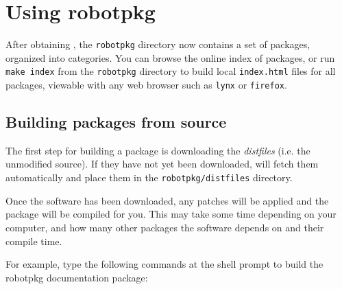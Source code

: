 %
%
%
%
%

\section{Using robotpkg} %

After obtaining \robotpkg, the  {\tt robotpkg} directory now  contains a set of
packages, organized   into  categories.  You can   browse  the online  index of
packages, or run {\tt  make index} from the {\tt  robotpkg} directory to  build
local {\tt index.html}  files for all  packages, viewable with any web  browser
such as {\tt lynx} or {\tt firefox}.


\subsection{Building packages from source} %

The  first step for  building  a  package  is  downloading the {\em  distfiles}
(i.e. the unmodified  source). If they have not  yet been downloaded, \robotpkg
will  fetch them automatically  and place them  in the {\tt robotpkg/distfiles}
directory.

Once the software  has  been downloaded,  any  patches will be applied  and the
package will  be compiled for  you.  This may  take some time depending on your
computer, and how many other packages the software depends on and their compile
time.

For  example,  type the following  commands  at the shell   prompt to build the
robotpkg documentation package:

